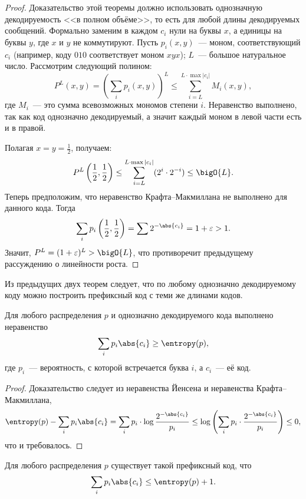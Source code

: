 \begin{proof}
    Доказательство этой теоремы должно использовать однозначную декодируемость <<в полном объёме>>, то
    есть для любой длины декодируемых сообщений. Формально заменим в каждом $c_i$ нули на буквы $x$, а
    единицы на буквы $y$, где $x$ и $y$ не коммутируют. Пусть $p_i(x, y)$~--- моном, соответствующий
    $c_i$ (например, коду $010$ соответствует моном $xyx$); $L$~--- большое натуральное число. Рассмотрим
    следующий полином:
    $$
        P^L(x, y) = \left(\sum\limits_{i} p_i(x, y) \right)^L \le \sum_{i = L}^{L \cdot \max |c_i|}
        M_{i}(x, y),
    $$
    где $M_i$~--- это сумма всевозможных мономов степени $i$. Неравенство выполнено, так как код
    однозначно декодируемый, а значит каждый моном в левой части есть и в правой.

    Полагая $x = y = \frac{1}{2}$, получаем:
    $$
        P^L\left(\frac{1}{2},\frac{1}{2}\right) \le \sum_{i = L}^{L \cdot \max |c_i|}(2^i \cdot 2^{-i})
        \le \bigO{L}.
    $$
    Теперь предположим, что неравенство Крафта--Макмиллана не выполнено для данного кода. Тогда 
    $$
        \sum_i p_i\left(\frac{1}{2},\frac{1}{2}\right) = \sum 2^{-\abs{c_i}} = 1 + \varepsilon > 1.
    $$
    Значит, $P^L = (1 + \varepsilon)^{L} > \bigO{L}$, что противоречит предыдущему рассуждению о линейности
    роста.
\end{proof}

Из предыдущих двух теорем следует, что по любому однозначно декодируемому коду можно построить префиксный
код с теми же длинами кодов.

\begin{theorem}[Шеннон]
    Для любого распределения $p$ и однозначно декодируемого кода выполнено неравенство
    $$
        \sum_i p_i\abs{c_i} \ge \entropy(p),
    $$
    где $p_i$~--- вероятность, с которой встречается буква $i$, а $c_i$~--- её код. 
\end{theorem}

\begin{proof}
    Доказательство следует из неравенства Йенсена и неравенства Крафта--Макмиллана, 
    $$
        \entropy(p) - \sum_i p_i\abs{c_i} = \sum_i p_i \cdot \log\frac{2^{-\abs{c_i}}}{p_i}
            \le \log\left(\sum_i p_i \cdot \frac{2^{-\abs{c_i}}}{p_i} \right) \le 0,
    $$
    что и требовалось.
\end{proof}

\begin{theorem}
    \label{th:prefix-code}
    Для любого распределения $p$ существует такой префиксный код, что
    $$
        \sum_i p_i\abs{c_i} \le \entropy(p) + 1.
    $$
\end{theorem}

